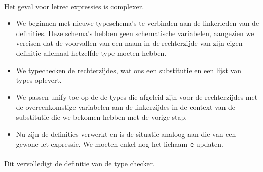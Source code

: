 \documentclass[a4paper,10pt]{article}
\begin{document}
\paragraph{}
Het geval voor letrec expressies is complexer.
\begin{itemize}
\item We beginnen met nieuwe typeschema's te verbinden aan de linkerleden van de definities. Deze schema's hebben geen schematische variabelen, aangezien we vereisen dat de voorvallen van een naam in de rechterzijde van zijn eigen definitie allemaal hetzelfde type moeten hebben.
\item We typechecken de rechterzijdes, wat ons een substitutie en een lijst van types oplevert.
\item We passen unify toe op de de types die afgeleid zijn voor de rechterzijdes met de overeenkomstige variabelen aan de linkerzijdes in de context van de substitutie die we bekomen hebben met de vorige stap.
\item Nu zijn de definities verwerkt en is de situatie analoog aan die van een gewone let expressie. We moeten enkel nog het lichaam \texttt{e} updaten.
\end{itemize}
\paragraph{}
Dit vervolledigt de definitie van de type checker.
\end{document}

